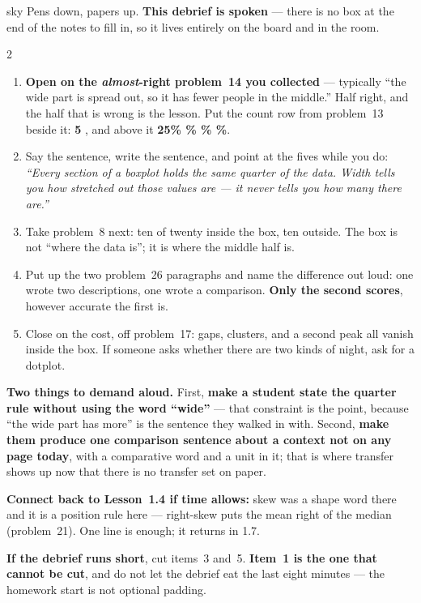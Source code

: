 \documentclass[10pt]{article}
\begin{document}
\boxguard
\begin{skillbox}{sky}
Pens down, papers up. \textbf{This debrief is spoken} --- there is no box at the end of the notes
to fill in, so it lives entirely on the board and in the room.
\begin{multicols}{2}
\begin{enumerate}[leftmargin=1.3em, nosep, itemsep=3pt]
  \item \textbf{Open on the \emph{almost}-right problem~14 you collected} --- typically ``the
        wide part is spread out, so it has fewer people in the middle.'' Half right, and the half
        that is wrong is the lesson. Put the count row from problem~13 beside it: \textbf{5   }, and above it \textbf{25\% \% \% \%}.
  \item Say the sentence, write the sentence, and point at the fives while you do: \emph{``Every
        section of a boxplot holds the same quarter of the data. Width tells you how stretched out
        those values are --- it never tells you how many there are.''}
  \item Take problem~8 next: ten of twenty inside the box, ten outside. The box is not ``where
        the data is''; it is where the middle half is.
  \item Put up the two problem~26 paragraphs and name the difference out loud: one wrote two
        descriptions, one wrote a comparison. \textbf{Only the second scores}, however accurate
        the first is.
  \item Close on the cost, off problem~17: gaps, clusters, and a second peak all vanish inside
        the box. If someone asks whether there are two kinds of night, ask for a dotplot.
\end{enumerate}
\columnbreak
\textbf{Two things to demand aloud.} First, \textbf{make a student state the quarter rule without
using the word ``wide''} --- that constraint is the point, because ``the wide part has more'' is
the sentence they walked in with. Second, \textbf{make them produce one comparison sentence about
a context not on any page today}, with a comparative word and a unit in it; that is where transfer
shows up now that there is no transfer set on paper.

\textbf{Connect back to Lesson~1.4 if time allows:} skew was a shape word there and it is a
position rule here --- right-skew puts the mean right of the median (problem~21). One line is
enough; it returns in 1.7.

\textbf{If the debrief runs short}, cut items~3 and~5. \textbf{Item~1 is the one that cannot be
cut}, and do not let the debrief eat the last eight minutes --- the homework start is not
optional padding.
\end{multicols}
\end{skillbox}
\end{document}
